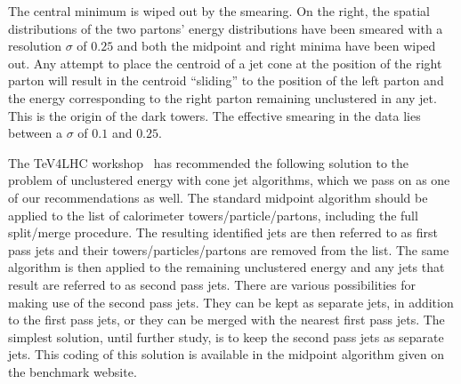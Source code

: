\documentclass[12pt]{iopart}
\begin{document}
%
The central minimum is wiped out by the smearing. On the right, the spatial distributions of the two partons'
energy  distributions have been smeared with a resolution $\sigma$ of $0.25$ and both the midpoint and right minima
have been wiped out. Any attempt to place the centroid  of a jet cone at  the position of the right parton will
result in the centroid ``sliding''  to the position of the left parton and the energy corresponding to the right
parton remaining  unclustered in any jet. This is the origin of the dark towers. The effective smearing in the data
lies between a $\sigma$ of $0.1$ and $0.25$. 

The TeV4LHC workshop~\cite{Group:2006rt} has recommended the following solution to the problem of unclustered energy with
cone jet algorithms, which we pass on as one of our recommendations as well. The standard midpoint algorithm should
be applied to the list of calorimeter towers/particle/partons, including the full split/merge procedure. The
resulting identified jets are then referred to as first pass jets and their towers/particles/partons are removed
from the list. The same algorithm is then applied to the remaining unclustered energy and any jets that result are
referred to as second pass jets. There are various possibilities for making use of the second pass jets. They can be
kept as separate jets, in addition to the first pass jets, or they can be merged with the nearest first pass jets.
The simplest solution, until further study, is to keep the second pass jets as separate jets. This coding of this
solution is available in the midpoint algorithm given on the benchmark website. 
\end{document}
